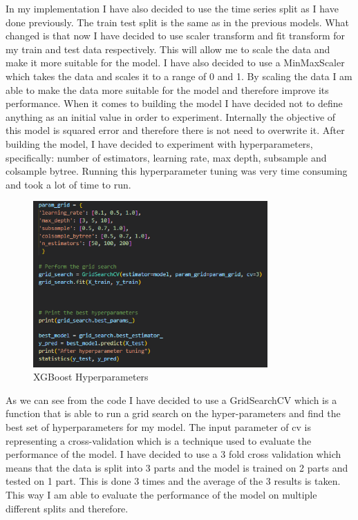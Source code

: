 \documentclass{imc-inf}
\begin{document}
	In my implementation I have also decided to use the time series split as I have done previously. The train test split is the same as in the previous models. What changed is that now I have decided to use 
	scaler transform and fit transform for my train and test data respectively. This will allow me to scale the data and make it more suitable for the model. I have also decided to use a MinMaxScaler which takes 
	the data and scales it to a range of 0 and 1. By scaling the data I am able to make the data more suitable for the model and therefore improve its performance. When it comes to building the model I have decided not to define
	anything as an initial value in order to experiment. Internally the objective of this model is squared error and therefore there is not need to overwrite it. After building the model, I have decided to 
	experiment with hyperparameters, specifically: number of estimators, learning rate, max depth, subsample and colsample bytree. Running this hyperparameter tuning was very time consuming and took a lot of time to run. 
	\begin{figure}[h]
		\centering
		\includegraphics[width=0.8\textwidth]{xgboost_tuning_code.png}
		\caption{XGBoost Hyperparameters}
		\label{fig:xgboost_hyperparameters}
	\end{figure}
	As we can see from the code I have decided to use a GridSearchCV which is a function that is able to run a grid search on the hyper-parameters and find the best set of hyperparameters for my model.
	The input parameter of cv is representing a cross-validation which is a technique used to evaluate the performance of the model. I have decided to use a 3 fold cross validation which means that the data is split into 3 parts and
	the model is trained on 2 parts and tested on 1 part. This is done 3 times and the average of the 3 results is taken. This way I am able to evaluate the performance of the model on multiple different splits and therefore.
\end{document}
